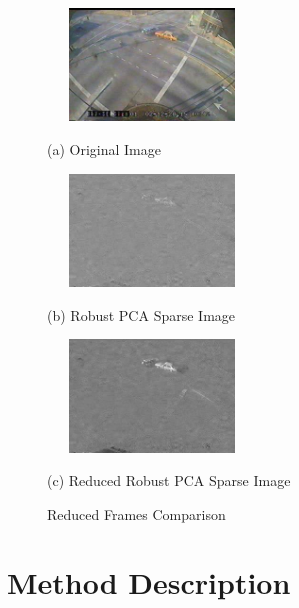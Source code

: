 \documentclass{article}
\begin{document}
\begin{figure}[htb]

\begin{minipage}[b]{0.3333\linewidth}
  \centering
  \centerline{\includegraphics[width=5.55cm, height=3cm]{Imgs/Orig_1228021540.jpg}}
  \centerline{(a) Original Image}\medskip
\end{minipage}
%
\begin{minipage}[b]{0.3333\linewidth}
  \centering
  \centerline{\includegraphics[width=5.55cm, height=3cm]{Imgs/SP_IMG_R_1228021540.jpg}}
  \centerline{(b) Robust PCA Sparse Image}\medskip
\end{minipage}
\hfill
\begin{minipage}[b]{0.3333\linewidth}
  \centering
  \centerline{\includegraphics[width=5.55cm, height = 3cm]{Imgs/SP_IMG_Reduced_1228021540.jpg}}
  \centerline{(c) Reduced Robust PCA Sparse Image}\medskip
\end{minipage}
%
\caption{Reduced Frames Comparison}
\label{fig:reduceComp}
%
\end{figure}

\section{Method Description}
\end{document}

